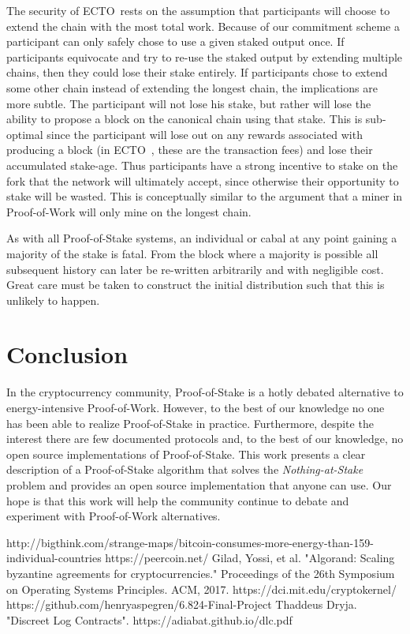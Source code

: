 \documentclass{article}
\newcommand{\coin}{ \textsc{ECTO}\ }
\begin{document}
The security of \coin rests on the assumption that participants will choose to extend the chain with the most total work. Because of our commitment scheme a participant can only safely chose to use a given staked output once. If participants equivocate and try to re-use the staked output by extending multiple chains, then they could lose their stake entirely. If participants chose to extend some other chain instead of extending the longest chain, the implications are more subtle. The participant will not lose his stake, but rather will lose the ability to propose a block on the canonical chain using that stake. This is sub-optimal since the participant will lose out on any rewards associated with producing a block (in \coin, these are the transaction fees) and lose their accumulated stake-age. Thus participants have a strong incentive to stake on the fork that the network will ultimately accept, since otherwise their opportunity to stake will be wasted. This is conceptually similar to the argument that a miner in Proof-of-Work will only mine on the longest chain. 

As with all Proof-of-Stake systems, an individual or cabal at any point gaining a majority of the stake is fatal. From the block where a majority is possible all subsequent history can later be re-written arbitrarily and with negligible cost. Great care must be taken to construct the initial distribution such that this is unlikely to happen.

\section{Conclusion}
In the cryptocurrency community, Proof-of-Stake is a hotly debated alternative to energy-intensive Proof-of-Work. However, to the best of our knowledge no one has been able to realize Proof-of-Stake in practice. Furthermore, despite the interest there are few documented protocols and, to the best of our knowledge, no open source implementations of Proof-of-Stake. This work presents a clear description of a Proof-of-Stake algorithm that solves the \textit{Nothing-at-Stake} problem and provides an open source implementation that anyone can use. Our hope is that this work will help the community continue to debate and experiment with Proof-of-Work alternatives.    


\begin{thebibliography}{9}
http://bigthink.com/strange-maps/bitcoin-consumes-more-energy-than-159-individual-countries
https://peercoin.net/
Gilad, Yossi, et al. "Algorand: Scaling byzantine agreements for cryptocurrencies." Proceedings of the 26th Symposium on Operating Systems Principles. ACM, 2017.
https://dci.mit.edu/cryptokernel/
https://github.com/henryaspegren/6.824-Final-Project
 Thaddeus Dryja. "Discreet Log Contracts". https://adiabat.github.io/dlc.pdf
\end{thebibliography}
\end{document}
